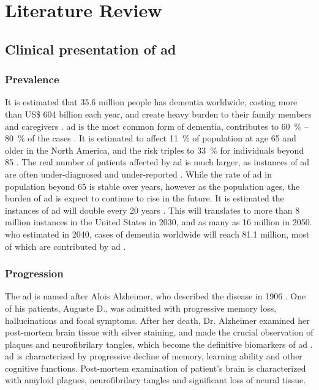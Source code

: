 \chapter{Literature Review}

\section{Clinical presentation of \gls{ad}}
\subsection{Prevalence}
It is estimated that 35.6 million people has dementia worldwide, costing more than US\$ 604 billion each year, and create heavy burden to their family members and caregivers \citep{who13}. \gls{ad} is the most common form of dementia, contributes to \SI{60}{\percent} -- \SI{80}{\percent} of the cases \citep{ad16}. It is estimated to affect \SI{11}{\percent} of population at age 65 and older in the North America, and the risk triples to \SI{33}{\percent} for individuals beyond 85 \citep{hebert13}. The real number of patients affected by \gls{ad} is much larger, as instances of \gls{ad} are often under-diagnosed and under-reported \citep{barrett06, zaleta12}. While the rate of \gls{ad} in population beyond 65 is stable over years, however as the population ages, the burden of \gls{ad} is expect to continue to rise in the future. It is estimated the instances of \gls{ad} will double every 20 years \citep{who13, hebert13}. This will translates to more than 8 million instances in the United States in 2030, and as many as 16 million in 2050. \gls{who} estimated in 2040, cases of dementia worldwide will reach 81.1 million, most of which are contributed by \gls{ad} \citep{who13}. 

\subsection{Progression}
The \gls{ad} is named after Alois Alzheimer, who described the disease in 1906 \citep{goedert06}. One of his patients, Auguste D., was admitted with progressive memory loss, hallucinations and focal symptoms. After her death, Dr. Alzheimer examined her post-mortem brain tissue with silver staining, and made the crucial observation of plaques and neurofibrilary tangles, which become the definitive biomarkers of \gls{ad} \citep{goedert06, dubois16}. \gls{ad} is characterized by progressive decline of memory, learning ability and other cognitive functions. Post-mortem examination of patient's brain is characterized with amyloid plagues, neurofibrilary tangles and significant loss of neural tissue.

